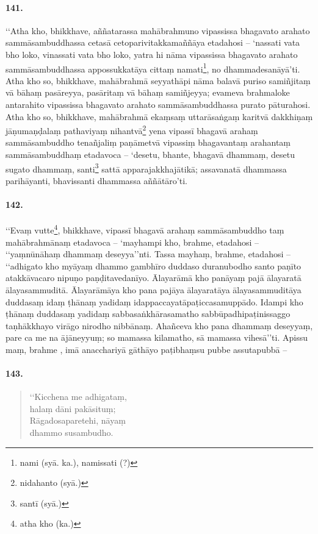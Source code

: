 \paragraph{141.} ‘‘Atha kho, bhikkhave, aññatarassa mahābrahmuno vipassissa bhagavato arahato sammāsambuddhassa cetasā cetoparivitakkamaññāya etadahosi – ‘nassati vata bho loko, vinassati vata bho loko, yatra hi nāma vipassissa bhagavato arahato sammāsambuddhassa appossukkatāya cittaṃ namati\footnote{nami (syā. ka.), namissati (?)}, no dhammadesanāyā’ti. Atha kho so, bhikkhave, mahābrahmā seyyathāpi nāma balavā puriso samiñjitaṃ vā bāhaṃ pasāreyya, pasāritaṃ vā bāhaṃ samiñjeyya; evameva brahmaloke antarahito vipassissa bhagavato arahato sammāsambuddhassa purato pāturahosi. Atha kho so, bhikkhave, mahābrahmā ekaṃsaṃ uttarāsaṅgaṃ karitvā dakkhiṇaṃ jāṇumaṇḍalaṃ pathaviyaṃ nihantvā\footnote{nidahanto (syā.)} yena vipassī bhagavā arahaṃ sammāsambuddho tenañjaliṃ paṇāmetvā vipassiṃ bhagavantaṃ arahantaṃ sammāsambuddhaṃ etadavoca – ‘desetu, bhante, bhagavā dhammaṃ, desetu sugato dhammaṃ, santi\footnote{santī (syā.)} sattā apparajakkhajātikā; assavanatā dhammassa parihāyanti, bhavissanti dhammassa aññātāro’ti.

\paragraph{142.} ‘‘Evaṃ vutte\footnote{atha kho (ka.)}, bhikkhave, vipassī bhagavā arahaṃ sammāsambuddho taṃ mahābrahmānaṃ etadavoca – ‘mayhampi kho, brahme, etadahosi – ‘‘yaṃnūnāhaṃ dhammaṃ deseyya’’nti. Tassa mayhaṃ, brahme, etadahosi – ‘‘adhigato kho myāyaṃ dhammo gambhīro duddaso duranubodho santo paṇīto atakkāvacaro nipuṇo paṇḍitavedanīyo. Ālayarāmā kho panāyaṃ pajā ālayaratā ālayasammuditā. Ālayarāmāya kho pana pajāya ālayaratāya ālayasammuditāya duddasaṃ idaṃ ṭhānaṃ yadidaṃ idappaccayatāpaṭiccasamuppādo. Idampi kho ṭhānaṃ duddasaṃ yadidaṃ sabbasaṅkhārasamatho sabbūpadhipaṭinissaggo taṇhākkhayo virāgo nirodho nibbānaṃ. Ahañceva kho pana dhammaṃ deseyyaṃ, pare ca me na ājāneyyuṃ; so mamassa kilamatho, sā mamassa vihesā’’ti. Apissu maṃ, brahme , imā anacchariyā gāthāyo paṭibhaṃsu pubbe assutapubbā –

\paragraph{143.}\begin{verse}
  ‘‘Kicchena me adhigataṃ, \\halaṃ dāni pakāsituṃ;\\
  Rāgadosaparetehi, nāyaṃ \\dhammo susambudho.
\end{verse}

